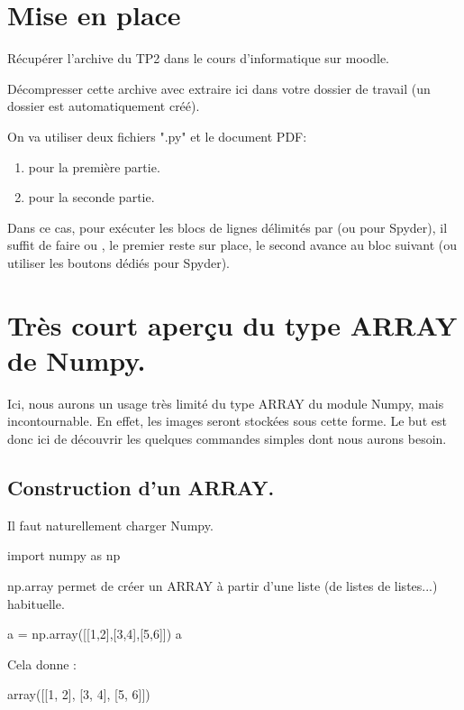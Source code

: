 \documentclass[french,11pt,twoside]{VcCours}
\begin{document}

\tableofcontents
\separationTitre

\section*{Mise en place}
Récupérer l'archive du TP2 dans le cours d'informatique sur moodle.

Décompresser cette archive avec \og{} extraire ici \fg{} dans votre dossier de travail
(un dossier  est automatiquement créé). 

On va utiliser deux fichiers ".py" et le document PDF:
  \begin{enumerate}
    \item {} pour la première partie.
    \item {} pour la seconde partie.
  \end{enumerate}
  Dans ce cas, pour exécuter les blocs de lignes délimités par \code{\#\#}
  (ou \code{\#\%\%} pour Spyder), 
  il suffit de faire  ou ,
  le premier reste sur place, le second avance au bloc suivant (ou
  utiliser les boutons dédiés pour Spyder). 



\section{Très court aperçu du type ARRAY de Numpy.}

Ici, nous aurons un usage très limité du type ARRAY du module Numpy,
mais incontournable. En effet, les images seront stockées sous cette forme.
Le but est donc ici de découvrir les quelques commandes simples dont nous aurons besoin.

\pagebreak
\subsection{Construction d'un ARRAY.}
Il faut naturellement charger Numpy.
\begin{PY}
import numpy as np
\end{PY}
np.array permet de créer un ARRAY à partir d'une liste (de listes de listes...) habituelle.
\begin{PY}
a = np.array([[1,2],[3,4],[5,6]])
a
\end{PY}
Cela donne :
\begin{PYout}
array([[1, 2],
       [3, 4],
       [5, 6]])
\end{PYout}
\end{document}
